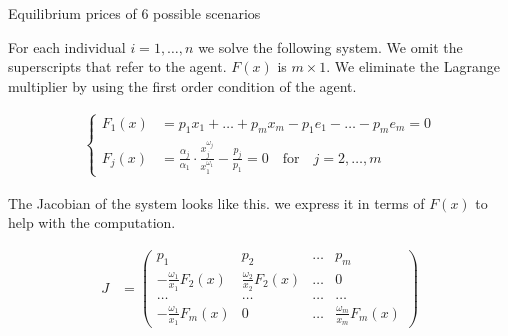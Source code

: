 \documentclass[a4paper,12pt]{article}
\begin{document}
    
        \begin{table}[!htbp]
            \centering
            \caption[Short Caption for LoT]{Equilibrium prices of $6$ possible scenarios}\label{table_ex5}
        \end{table}
        
        
    For each individual $i=1,\dots, n$ we solve the following system. We omit the superscripts that refer to the agent. $F(x)$ is $m\times 1$. We eliminate the Lagrange multiplier by using the first order condition of the agent. 

    \begin{align}\label{systemF}
    \begin{cases}
        F_1(x) & = p_1x_1 + \dots + p_mx_m - p_1e_1 -\dots - p_me_m = 0 \\  F_j(x) & = \frac{\alpha_j}{\alpha_1} \cdot \frac{x_j^{\omega_j}}{x_1^{\omega_1}} - \frac{p_j}{p_1} = 0 \quad\text{for}\quad j = 2,\dots,m
    \end{cases}
    \end{align}
    
    The Jacobian of the system looks like this. we express it in terms of $F(x)$ to help with the computation. 
    
    \begin{align*}
        J & = \begin{pmatrix} p_1 & p_2 & \dots & p_m \\ -\frac{\omega_1}{x_1}  F_2(x) & \frac{\omega_2}{x_2} F_2(x) & \dots & 0 \\ \dots & \dots & \dots &\dots \\ -\frac{\omega_1}{x_1} F_m(x) & 0 & \dots & \frac{\omega_m}{x_m} F_m(x) \end{pmatrix}
    \end{align*}
    
    
    
  

    






    


    

    
    
 
\end{document}
